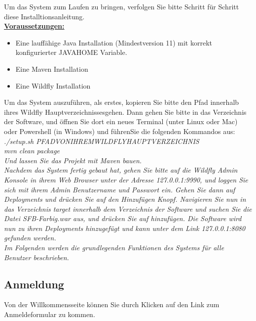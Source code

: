 \documentclass[enabledeprecatedfontcommands,fontsize=12pt,paper=a4,twoside]{scrartcl}
\begin{document}
Um das System zum Laufen zu bringen, verfolgen Sie bitte Schritt für Schritt diese Installtionsanleitung.\\

\underline{\textbf{Voraussetzungen:}}

\begin{itemize}
	\item Eine lauffähige Java Installation (Mindestversion 11) mit korrekt konfigurierter JAVA\textunderscore HOME Variable.\\
	\item Eine Maven Installation
	\item Eine Wildfly Installation
\end{itemize}

Um das System auszuführen, als erstes, kopieren Sie bitte den Pfad innerhalb ihres Wildfly Hauptverzeichnissesgehen. Dann gehen Sie bitte in das Verzeichnis der Software, und öffnen Sie dort ein neues Terminal (unter Linux oder Mac) oder Powershell (in Windows) und führenSie die folgenden Kommandos aus:\\

\em{./setup.sh PFAD\textunderscore VON\textunderscore IHREM\textunderscore WILDFLY\textunderscore HAUPTVERZEICHNIS}\\

\em{mvn clean package}\\

Und lassen Sie das Projekt mit Maven bauen.\\

Nachdem das System fertig gebaut hat, gehen Sie bitte auf die Wildfly Admin Konsole in ihrem Web Browser unter der Adresse 127.0.0.1:9990, und loggen Sie sich mit ihrem Admin
Benutzername und Passwort ein. Gehen Sie dann auf Deployments und drücken Sie auf den Hinzufügen Knopf. Navigieren Sie nun in das Verzeichnis target innerhalb dem Verzeichnis der Software und suchen Sie die Datei SFB-Farbig.war aus, und drücken Sie auf hinzufügen. Die Software wird nun zu ihren Deployments hinzugefügt und kann unter dem Link 127.0.0.1:8080 gefunden werden. \\

Im Folgenden werden die grundlegenden Funktionen des Systems für alle Benutzer beschrieben. \\

\subsection{Anmeldung}
Von der Willkommensseite können Sie durch Klicken auf den Link zum Anmeldeformular zu kommen. \\
\end{document}

